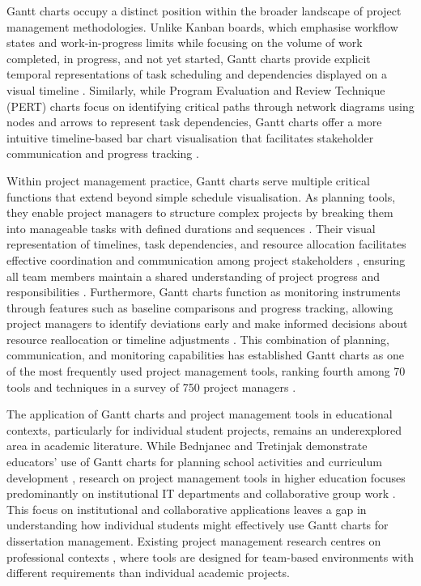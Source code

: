 \documentclass[12pt,nonacm,acmlarge,titlepage,screen]{acmart}
\begin{document}
Gantt charts occupy a distinct position within the broader landscape of project management methodologies. Unlike Kanban boards, which emphasise workflow states and work-in-progress limits while focusing on the volume of work completed, in progress, and not yet started, Gantt charts provide explicit temporal representations of task scheduling and dependencies displayed on a visual timeline \cite{smartsheet_gantt_kanban_2025}. Similarly, while Program Evaluation and Review Technique (PERT) charts focus on identifying critical paths through network diagrams using nodes and arrows to represent task dependencies, Gantt charts offer a more intuitive timeline-based bar chart visualisation that facilitates stakeholder communication and progress tracking \cite{smartsheet_pert_gantt_2021, projectmanager_gantt_pert_network_2024}. 

Within project management practice, Gantt charts serve multiple critical functions that extend beyond simple schedule visualisation. As planning tools, they enable project managers to structure complex projects by breaking them into manageable tasks with defined durations and sequences \cite{wadhwa_role_2024}. Their visual representation of timelines, task dependencies, and resource allocation facilitates effective coordination and communication among project stakeholders \cite{wadhwa_role_2024}, ensuring all team members maintain a shared understanding of project progress and responsibilities \cite{wadhwa_role_2024}. Furthermore, Gantt charts function as monitoring instruments through features such as baseline comparisons and progress tracking, allowing project managers to identify deviations early and make informed decisions about resource reallocation or timeline adjustments \cite{wadhwa_role_2024}. This combination of planning, communication, and monitoring capabilities has established Gantt charts as one of the most frequently used project management tools, ranking fourth among 70 tools and techniques in a survey of 750 project managers \cite{besner_2008, wadhwa_role_2024}.

The application of Gantt charts and project management tools in educational contexts, particularly for individual student projects, remains an underexplored area in academic literature. While Bednjanec and Tretinjak demonstrate educators' use of Gantt charts for planning school activities and curriculum development \cite{BednjanecAndrea2013AoGc}, research on project management tools in higher education focuses predominantly on institutional IT departments \cite{Johnston_2007} and collaborative group work \cite{hassen_use_2024}. This focus on institutional and collaborative applications leaves a gap in understanding how individual students might effectively use Gantt charts for dissertation management. Existing project management research centres on professional contexts \cite{besner_2008}, where tools are designed for team-based environments with different requirements than individual academic projects.
\end{document}
